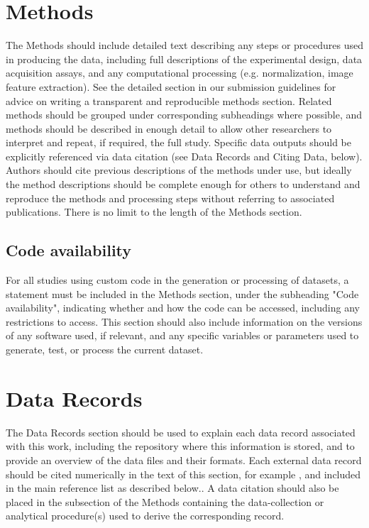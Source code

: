 \documentclass[english]{article}
\begin{document}
\section*{Methods}

The Methods should include detailed text describing any steps or procedures used in producing the data, including full descriptions of the experimental design, data acquisition assays, and any computational processing (e.g. normalization, image feature extraction). See the detailed section in our submission guidelines for advice on writing a transparent and reproducible methods section. Related methods should be grouped under corresponding subheadings where possible, and methods should be described in enough detail to allow other researchers to interpret and repeat, if required, the full study. Specific data outputs should be explicitly referenced via data citation (see Data Records and Citing Data, below).
Authors should cite previous descriptions of the methods under use, but ideally the method descriptions should be complete enough for others to understand and reproduce the methods and processing steps without referring to associated publications. There is no limit to the length of the Methods section.


\subsection*{Code availability}

For all studies using custom code in the generation or processing of datasets, a statement must be included in the Methods section, under the subheading "Code availability", indicating whether and how the code can be accessed, including any restrictions to access. This section should also include information on the versions of any software used, if relevant, and any specific variables or parameters used to generate, test, or process the current dataset. 


\section*{Data Records}

The Data Records section should be used to explain each data record associated with this work, including the repository where this information is stored, and to provide an overview of the data files and their formats. Each external data record should be cited numerically in the text of this section, for example \cite{cite3, cite4, cite5, cite6}, and included in the main reference list as described below.. A data citation should also be placed in the subsection of the Methods containing the data-collection or analytical procedure(s) used to derive the corresponding record.
\end{document}
